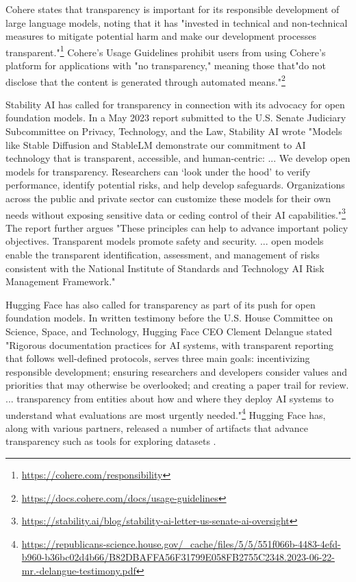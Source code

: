 \documentclass[screen, authorversion, acmsmall]{acmart}
\begin{document}
Cohere states that transparency is important for its responsible development of large language models, noting that it has "invested in technical and non-technical measures to mitigate potential harm and make our development processes transparent."\footnote{\url{https://cohere.com/responsibility}} 
Cohere's Usage Guidelines prohibit users from using Cohere's platform for applications with "no transparency," meaning those that"do not disclose that the content is generated through automated means."\footnote{\url{https://docs.cohere.com/docs/usage-guidelines}} 

Stability AI has called for transparency in connection with its advocacy for open foundation models. In a May 2023 report submitted to the U.S. Senate Judiciary Subcommittee on Privacy, Technology, and the Law, Stability AI wrote "Models like Stable Diffusion and StableLM demonstrate our commitment to AI technology that is transparent, accessible, and human-centric: ... We develop open models for transparency. Researchers can `look under the hood' to verify performance, identify potential risks, and help develop safeguards. Organizations across the public and private sector can customize these models for their own needs without exposing sensitive data or ceding control of their AI capabilities."\footnote{\url{https://stability.ai/blog/stability-ai-letter-us-senate-ai-oversight}} The report further argues "These principles can help to advance important policy objectives. Transparent models promote safety and security. ... open models enable the transparent identification, assessment, and management of risks consistent with the National Institute of Standards and Technology AI Risk Management Framework."

Hugging Face has also called for transparency as part of its push for open foundation models. In written testimony before the U.S. House Committee on Science, Space, and Technology, Hugging Face CEO Clement Delangue stated "Rigorous documentation practices for AI systems, with transparent reporting that follows well-defined protocols, serves three main goals: incentivizing responsible development; ensuring researchers and developers consider values and priorities that may otherwise be overlooked; and creating a paper trail for review. ... transparency from entities about how and where they deploy AI systems to understand what evaluations are most urgently needed."\footnote{\url{https://republicans-science.house.gov/_cache/files/5/5/551f066b-4483-4efd-b960-b36bc02d4b66/B82DBAFFA56F31799E058FB2755C2348.2023-06-22-mr.-delangue-testimony.pdf}} Hugging Face has, along with various partners, released a number of artifacts that advance transparency such as tools for exploring datasets \citep{piktus2023roots}. 
\end{document}
